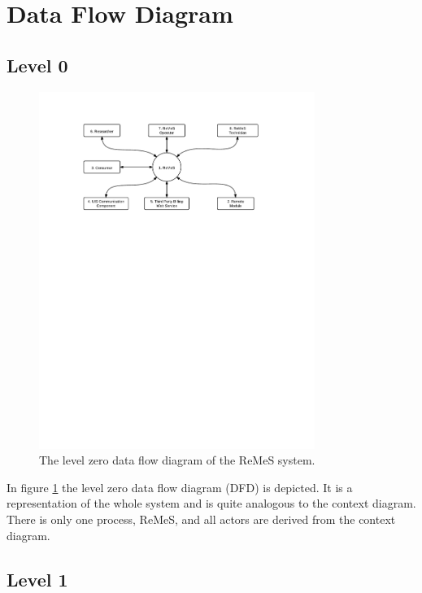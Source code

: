 \section{Data Flow Diagram}
\label{sec:data-flow-diagram}

\subsection{Level 0}

\begin{figure}[h!]
	\begin{centering}
		\includegraphics[width=0.8\textwidth]{figs/level-0.pdf}
		\caption{The level zero data flow diagram of the ReMeS system.}
		\label{fig:data-flow-diagram-lvl0}
	\end{centering}
\end{figure}

\npar In figure \ref{fig:data-flow-diagram-lvl0} the level zero data flow
diagram (DFD) is depicted. It is a representation of the whole system and is
quite analogous to the context diagram. There is only one process, ReMeS, and
all actors are derived from the context diagram. 

\subsection{Level 1}


